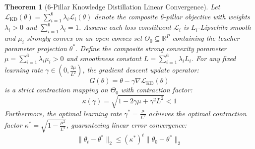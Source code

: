 \documentclass{article}
\newtheorem{theorem}{Theorem}
\begin{document}
\begin{theorem}[6-Pillar Knowledge Distillation Linear Convergence]
\label{thm:kd_convergence}
Let $\mathcal{L}_{\text{KD}}(\theta) = \sum_{i=1}^6 \lambda_i \mathcal{L}_i(\theta)$ denote the composite 6-pillar objective with weights $\lambda_i > 0$ and $\sum_{i=1}^6 \lambda_i = 1$. Assume each loss constituent $\mathcal{L}_i$ is $L_i$-Lipschitz smooth and $\mu_i$-strongly convex on an open convex set $\Theta_0 \subseteq \mathbb{R}^P$ containing the teacher parameter projection $\theta^*$. 
Define the composite strong convexity parameter $\mu = \sum_{i=1}^6 \lambda_i \mu_i > 0$ and smoothness constant $L = \sum_{i=1}^6 \lambda_i L_i$.
For any fixed learning rate $\gamma \in \left(0, \frac{2\mu}{L^2}\right)$, the gradient descent update operator:
\begin{equation}
    G(\theta) = \theta - \gamma \nabla \mathcal{L}_{\text{KD}}(\theta)
\end{equation}
is a strict contraction mapping on $\Theta_0$ with contraction factor:
\begin{equation}
    \kappa(\gamma) = \sqrt{1 - 2 \gamma \mu + \gamma^2 L^2} < 1
\end{equation}
Furthermore, the optimal learning rate $\gamma^* = \frac{\mu}{L^2}$ achieves the optimal contraction factor $\kappa^* = \sqrt{1 - \frac{\mu^2}{L^2}}$, guaranteeing linear error convergence:
\begin{equation}
    \|\theta_t - \theta^*\|_2 \le (\kappa^*)^t \|\theta_0 - \theta^*\|_2
\end{equation}
\end{theorem}
\end{document}
